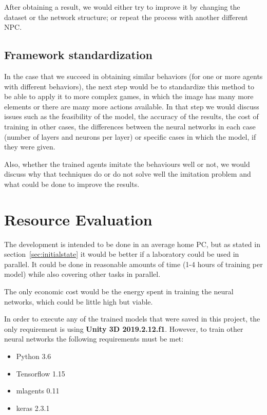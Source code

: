 After obtaining a result, we would either try to improve it by changing the dataset or the network structure; or repeat the process with another different NPC.

\subsection{Framework standardization}

In the case that we succeed in obtaining similar behaviors (for one or more agents with different behaviors), the next step would be to standardize this method to be able to apply it to more complex games, in which the image has many more elements or there are many more actions available. In that step we would discuss issues such as the feasibility of the model, the accuracy of the results, the cost of training in other cases, the differences between the neural networks in each case (number of layers and neurons per layer) or specific cases in which the model, if they were given.

Also, whether the trained agents imitate the behaviours well or not, we would discuss why that techniques do or do not solve well the imitation problem and what could be done to improve the results.

\section{Resource Evaluation}

The development is intended to be done in an average home PC, but as stated in section~\ref{sec:initialstate} it would be better if a laboratory could be used in parallel. It could be done in reasonable amounts of time (1-4 hours of training per model) while also covering other tasks in parallel.

The only economic cost would be the energy spent in training the neural networks, which could be little high but viable.

In order to execute any of the trained models that were saved in this project, the only requirement is using \textbf{Unity 3D 2019.2.12.f1}. However, to train other neural networks the following requirements must be met:

\begin{itemize}
 \item Python 3.6
 \item Tensorflow 1.15
 \item mlagents 0.11
 \item keras 2.3.1
\end{itemize}

